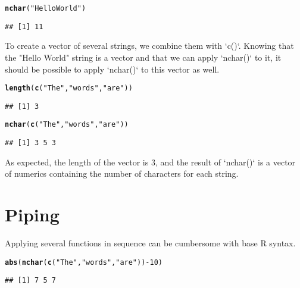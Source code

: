 \documentclass[twoside,twocolumn]{article}\usepackage[]{graphicx}\usepackage[dvipsnames]{xcolor}
\makeatletter
\newcommand{\hlnum}[1]{\textcolor[rgb]{0.686,0.059,0.569}{#1}}%
\newcommand{\hlstr}[1]{\textcolor[rgb]{0.192,0.494,0.8}{#1}}%
\newcommand{\hlopt}[1]{\textcolor[rgb]{0,0,0}{#1}}%
\newcommand{\hlstd}[1]{\textcolor[rgb]{0.345,0.345,0.345}{#1}}%
\newcommand{\hlkwd}[1]{\textcolor[rgb]{0.737,0.353,0.396}{\textbf{#1}}}%
\newenvironment{kframe}{%
 \def\at@end@of@kframe{}%
 \ifinner\ifhmode%
  \def\at@end@of@kframe{\end{minipage}}%
  \begin{minipage}{\columnwidth}%
 \fi\fi%
 \def\FrameCommand##1{\hskip\@totalleftmargin \hskip-\fboxsep
 \colorbox{shadecolor}{##1}\hskip-\fboxsep
     \hskip-\linewidth \hskip-\@totalleftmargin \hskip\columnwidth}%
 \MakeFramed {\advance\hsize-\width
   \@totalleftmargin\z@ \linewidth\hsize
   \@setminipage}}%
 {\par\unskip\endMakeFramed%
 \at@end@of@kframe}
\newenvironment{knitrout}{}{} %
\makeatother
\begin{document}
\begin{knitrout}
\color{fgcolor}\begin{kframe}
\begin{alltt}
\hlkwd{nchar}\hlstd{(}\hlstr{"Hello World"}\hlstd{)}
\end{alltt}
\begin{verbatim}
## [1] 11
\end{verbatim}
\end{kframe}
\end{knitrout}

To create a vector of several strings, we combine them with `c()`. Knowing that the "Hello World" string is a vector and that we can apply `nchar()` to it, it should be possible to apply `nchar()` to this vector as well.

\begin{knitrout}
\color{fgcolor}\begin{kframe}
\begin{alltt}
\hlkwd{length}\hlstd{(}\hlkwd{c}\hlstd{(}\hlstr{"The"}\hlstd{,}\hlstr{"words"}\hlstd{,}\hlstr{"are"}\hlstd{))}
\end{alltt}
\begin{verbatim}
## [1] 3
\end{verbatim}
\begin{alltt}
\hlkwd{nchar}\hlstd{(}\hlkwd{c}\hlstd{(}\hlstr{"The"}\hlstd{,}\hlstr{"words"}\hlstd{,}\hlstr{"are"}\hlstd{))}
\end{alltt}
\begin{verbatim}
## [1] 3 5 3
\end{verbatim}
\end{kframe}
\end{knitrout}

As expected, the length of the vector is 3, and the result of `nchar()` is a vector of numerics containing the number of characters for each string.

\section*{Piping}

Applying several functions in sequence can be cumbersome with base R syntax.

\begin{knitrout}
\color{fgcolor}\begin{kframe}
\begin{alltt}
\hlkwd{abs}\hlstd{(}\hlkwd{nchar}\hlstd{(}\hlkwd{c}\hlstd{(}\hlstr{"The"}\hlstd{,}\hlstr{"words"}\hlstd{,}\hlstr{"are"}\hlstd{))} \hlopt{-} \hlnum{10}\hlstd{)}
\end{alltt}
\begin{verbatim}
## [1] 7 5 7
\end{verbatim}
\end{kframe}
\end{knitrout}
\end{document}
